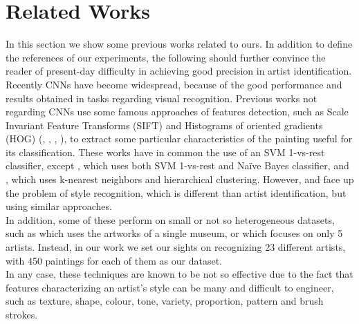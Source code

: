\documentclass{article}
\begin{document}
\section{Related Works}\label{relwor}

In this section we show some previous works related to ours. In addition to define the references of our experiments, the following should further convince the reader of present-day difficulty in achieving good precision in artist identification.\\
Recently CNNs have become widespread, because of the good performance and results obtained in tasks regarding visual recognition.
Previous works not regarding CNNs use some famous approaches of features detection, such as Scale Invariant Feature Transforms (SIFT) and Histograms of oriented gradients (HOG) (\cite{Saleh2015}, \cite{mensink2014}, \cite{lombardi05}, \cite{jou2011}), to extract some particular characteristics of the painting useful for its classification. These works have in common the use of an SVM 1-vs-rest classifier, except \cite{jou2011}, which uses both SVM 1-vs-rest and Naïve Bayes classifier, and \cite{lombardi05}, which uses k-nearest neighbors and hierarchical clustering. However, \cite{lombardi05} and \cite{jou2011} face up the problem of style recognition, which is different than artist identification, but using similar approaches.\\
In addition, some of these perform on small or not so heterogeneous datasets, such as \cite{mensink2014} which uses the artworks of a single museum, or \cite{jou2011} which focuses on only 5 artists. Instead, in our work we set our sights on recognizing 23 different artists, with 450 paintings for each of them as our dataset. \\
In any case, these techniques are known to be not so effective due to the fact that features characterizing an artist's style can be many and difficult to engineer, such as texture, shape, colour, tone, variety, proportion, pattern and brush strokes.\\
\end{document}
